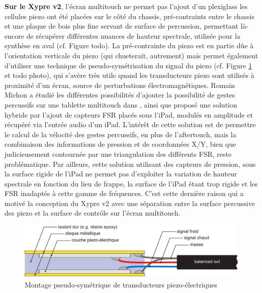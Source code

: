 \indent \textbf{Sur le Xypre v2}, l'écran multitouch ne permet pas l'ajout d'un plexiglass les cellules piezo ont été placées sur le côté du chassis, pré-contraints entre le chassis et une plaque de bois plus fine servant de surface de percussion, permettant là-encore de récupérer différentes nuances de hauteur spectrale, utilisée pour la synthèse en aval (cf. Figure todo). La pré-contrainte du piezo est en partie dûe à l'orientation verticale du piezo (qui chueterait, autrement) mais permet également d'utiliser une technique de pseudo-symétrisation du signal du piezo (cf. Figure \ref{fig:interface:balancedPiezo} et todo photo), qui s'avère très utile quand les transducteurs piezo sont utilisés à proximité d'un écran, source de perturbations électromagnétiques. Romain Michon a étudié les différentes possibilités d'ajouter la possibilité de gestes percussifs sur une tablette multitouch dans \cite{michon_nuance_2016}, ainsi que proposé une solution hybride par l'ajout de capteurs \gls{FSR} placés sous l'iPad, modulés en amplitude et récupéré via l'entrée audio d'un iPad. L'intérêt de cette solution est de permettre le calcul de la vélocité des gestes percussifs, en plus de l'aftertouch, mais la combinaison des informations de pression et de coordonnées X/Y, bien que judicieusement contournée par une triangulation des différents \gls{FSR}, reste problématique. Par ailleurs, cette solution utilisant des capteurs de pression, sous la surface rigide de l'iPad ne permet pas d'exploiter la variation de hauteur spectrale en fonction du lieu de frappe, la surface de l'iPad étant trop rigide et les \gls{FSR} inadaptés à cette gamme de fréquences. C'est cette dernière raison qui a motivé la conception du Xypre v2 avec une séparation entre la surface percussive des piezo et la surface de contrôle sur l'écran multitouch.



\begin{figure}[!htbp]
	\includegraphics[width=\textwidth]{gfx/05_interfaces/balancedPiezo.pdf}
	\caption{Montage pseudo-symétrique de transducteurs piezo-électriques}
	\label{fig:interface:balancedPiezo}
\end{figure}



